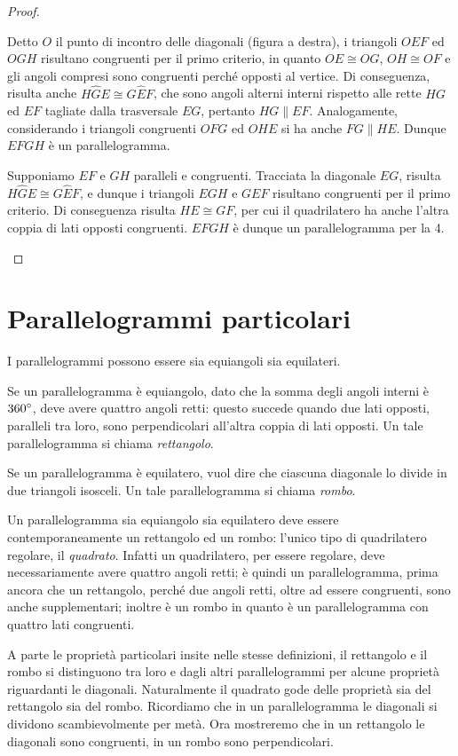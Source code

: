 \begin{proof}
\begin{enumerate*}
\item Detto $O$ il punto di incontro delle diagonali (figura a destra), i triangoli $OEF$ ed $OGH$ risultano congruenti per il primo criterio, in quanto $OE\cong OG$, $OH\cong OF$ e gli angoli compresi sono congruenti perché opposti al vertice. Di conseguenza, risulta anche $H\widehat{G}E\cong G\widehat{E}F$, che sono angoli alterni interni rispetto alle rette $HG$ ed $EF$ tagliate dalla trasversale $EG$, pertanto $HG\parallel EF$. Analogamente, considerando i triangoli congruenti $OFG$ ed $OHE$ si ha anche $FG\parallel HE$. Dunque $EFGH$ è un parallelogramma.
\item Supponiamo $EF$ e $GH$ paralleli e congruenti. Tracciata la diagonale $EG$, risulta $H\widehat{G}E\cong G\widehat{E}F$, e dunque i triangoli $EGH$ e $GEF$ risultano congruenti per il primo criterio. Di conseguenza risulta $HE\cong GF$, per cui il quadrilatero ha anche l'altra coppia di lati opposti congruenti. $EFGH$ è dunque un parallelogramma per la 4.
\end{enumerate*}
\end{proof}

\section{Parallelogrammi particolari}

I parallelogrammi possono essere sia equiangoli sia equilateri.

Se un parallelogramma è equiangolo, dato che la somma degli angoli interni è $360{}^{\circ}$, deve avere quattro angoli retti: questo succede quando due lati opposti, paralleli tra loro, sono perpendicolari all’altra coppia di lati opposti. Un tale parallelogramma si chiama \emph{rettangolo}.

Se un parallelogramma è equilatero, vuol dire che ciascuna diagonale lo divide in due triangoli isosceli. Un tale parallelogramma si chiama \emph{rombo}.

Un parallelogramma sia equiangolo sia equilatero deve essere contemporaneamente un rettangolo ed un rombo: l'unico tipo di quadrilatero regolare, il \emph{quadrato}. Infatti un quadrilatero, per essere regolare, deve necessariamente avere quattro angoli retti; è quindi un parallelogramma, prima ancora che un rettangolo, perché due angoli retti, oltre ad essere congruenti, sono anche supplementari; inoltre è un rombo in quanto è un parallelogramma con quattro lati congruenti.

A parte le proprietà particolari insite nelle stesse definizioni, il rettangolo e il rombo si distinguono tra loro e dagli altri parallelogrammi per alcune proprietà riguardanti le diagonali. Naturalmente il quadrato gode delle proprietà sia del rettangolo sia del rombo.
Ricordiamo che in un parallelogramma le diagonali si dividono scambievolmente per metà. Ora mostreremo che in un rettangolo le diagonali sono congruenti, in un rombo sono perpendicolari.

